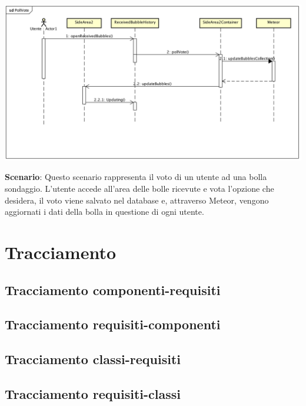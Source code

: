 \begin{center}
	\includegraphics[scale=0.4]{img/PollVote.png}
\end{center}



\textbf{Scenario}: 
Questo scenario rappresenta il voto di un utente ad una bolla sondaggio.
L’utente accede all’area delle bolle ricevute e vota l’opzione che desidera, il voto viene salvato 	nel database e, attraverso Meteor, vengono aggiornati i dati della bolla in questione di ogni 	utente. \\

\section{Tracciamento}

\subsection{Tracciamento componenti-requisiti}

\subsection{Tracciamento requisiti-componenti}


\subsection{Tracciamento classi-requisiti}

\subsection{Tracciamento requisiti-classi}




